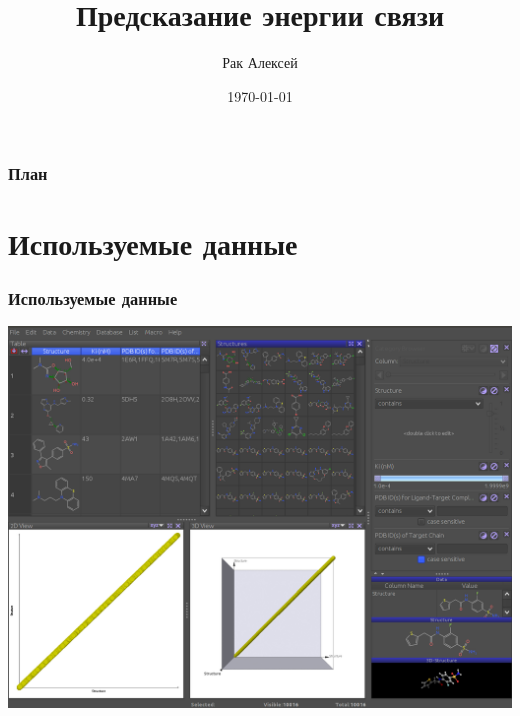 \documentclass{beamer}
\title{Предсказание энергии связи} %
\author{Рак Алексей} %
\date{\today} %
\begin{document}
\begin{frame}
\titlepage %
\end{frame}

\begin{frame}
\frametitle{План} %
\tableofcontents %
\end{frame}


\section{Используемые данные} %

\begin{frame}
\frametitle{Используемые данные}\begin{center}
\includegraphics[scale=0.2]{used_data.png}
\end{center}
\end{frame}
\end{document}

